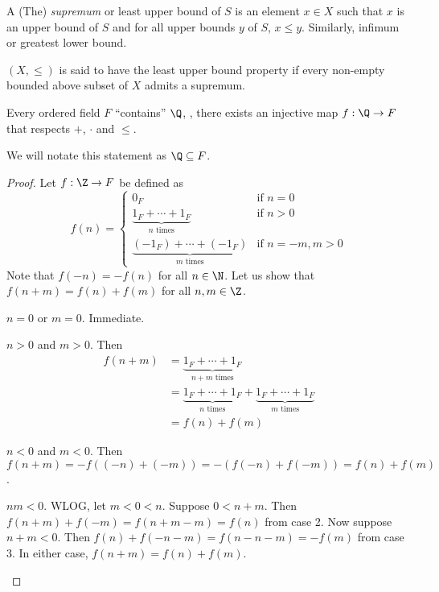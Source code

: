 A (The) \emph{supremum} or least upper bound of $S$ is an element $x \in X$
such that $x$ is an upper bound of $S$ and for all upper bounds $y$ of $S$,
$x \le y$.
Similarly, infimum or greatest lower bound.

$(X, \le)$ is said to have the least upper bound property if every non-empty
bounded above subset of $X$ admits a supremum.

\begin{theorem*}
    Every ordered field $F$ ``contains'' $\Q$, \ie, there exists an injective
    map $f : \Q \to F$ that respects $+$, $\cdot$ and $\le$.
\end{theorem*}
We will notate this statement as $\Q \subseteq F$.
\begin{proof}
    Let $f : \Z \to F$ be defined as \[
        f(n) = \begin{cases}
            0_F & \text{if } n = 0 \\
            \underbrace{1_F + \cdots + 1_F}_{n \text{ times}} & \text{if } n > 0 \\
            \underbrace{(-1_F) + \cdots + (-1_F)}_{m \text{ times}} & \text{if } n = -m, m > 0
        \end{cases}
    \]
    Note that $f(-n) = -f(n)$ for all $n \in \N$.
    Let us show that $f(n + m) = f(n) + f(m)$ for all $n, m \in \Z$.
    \begin{casework}
        \item $n = 0$ or $m = 0$. Immediate.
        \item $n > 0$ and $m > 0$.
        Then \begin{align*}
            f(n + m) &= \underbrace{1_F + \cdots + 1_F}_{n + m \text{ times}} \\
                     &= \underbrace{1_F + \cdots + 1_F}_{n \text{ times}} +
                        \underbrace{1_F + \cdots + 1_F}_{m \text{ times}} \\
                     &= f(n) + f(m)
        \end{align*}
        \item $n < 0$ and $m < 0$.
        Then $f(n + m) = -f((-n) + (-m)) = -(f(-n) + f(-m)) = f(n) + f(m)$.
        \item $nm < 0$. WLOG, let $m < 0 < n$.
        Suppose $0 < n + m$.
        Then $f(n + m) + f(-m) = f(n + m - m) = f(n)$ from case 2.
        Now suppose $n + m < 0$.
        Then $f(n) + f(-n-m) = f(n - n - m) = -f(m)$ from case 3.
        In either case, $f(n + m) = f(n) + f(m)$.
    \end{casework}

\end{proof}
